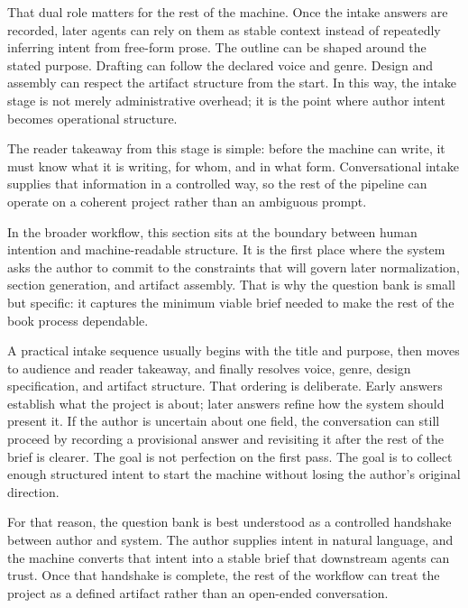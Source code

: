 \documentclass[11pt]{article}
\begin{document}
That dual role matters for the rest of the machine. Once the intake answers are recorded, later agents can rely on them as stable context instead of repeatedly inferring intent from free-form prose. The outline can be shaped around the stated purpose. Drafting can follow the declared voice and genre. Design and assembly can respect the artifact structure from the start. In this way, the intake stage is not merely administrative overhead; it is the point where author intent becomes operational structure.

The reader takeaway from this stage is simple: before the machine can write, it must know what it is writing, for whom, and in what form. Conversational intake supplies that information in a controlled way, so the rest of the pipeline can operate on a coherent project rather than an ambiguous prompt.

In the broader workflow, this section sits at the boundary between human intention and machine-readable structure. It is the first place where the system asks the author to commit to the constraints that will govern later normalization, section generation, and artifact assembly. That is why the question bank is small but specific: it captures the minimum viable brief needed to make the rest of the book process dependable.

A practical intake sequence usually begins with the title and purpose, then moves to audience and reader takeaway, and finally resolves voice, genre, design specification, and artifact structure. That ordering is deliberate. Early answers establish what the project is about; later answers refine how the system should present it. If the author is uncertain about one field, the conversation can still proceed by recording a provisional answer and revisiting it after the rest of the brief is clearer. The goal is not perfection on the first pass. The goal is to collect enough structured intent to start the machine without losing the author's original direction.

For that reason, the question bank is best understood as a controlled handshake between author and system. The author supplies intent in natural language, and the machine converts that intent into a stable brief that downstream agents can trust. Once that handshake is complete, the rest of the workflow can treat the project as a defined artifact rather than an open-ended conversation.
\end{document}
